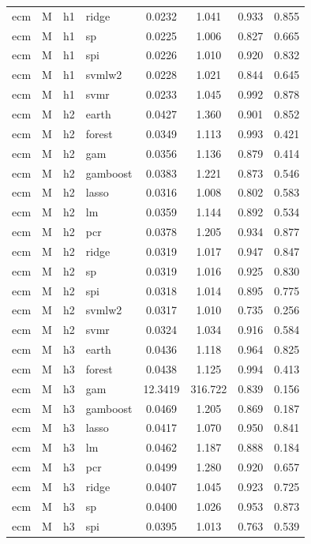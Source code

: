 \begin{ThreePartTable}
\begin{longtable}[t]{llclcccc}
ecm & M & h1 & ridge & 0.0232 & 1.041 & 0.933 & 0.855\\
ecm & M & h1 & sp & 0.0225 & 1.006 & 0.827 & 0.665\\
ecm & M & h1 & spi & 0.0226 & 1.010 & 0.920 & 0.832\\
ecm & M & h1 & svmlw2 & 0.0228 & 1.021 & 0.844 & 0.645\\
ecm & M & h1 & svmr & 0.0233 & 1.045 & 0.992 & 0.878\\
\addlinespace
ecm & M & h2 & earth & 0.0427 & 1.360 & 0.901 & 0.852\\
ecm & M & h2 & forest & 0.0349 & 1.113 & 0.993 & 0.421\\
ecm & M & h2 & gam & 0.0356 & 1.136 & 0.879 & 0.414\\
ecm & M & h2 & gamboost & 0.0383 & 1.221 & 0.873 & 0.546\\
ecm & M & h2 & lasso & 0.0316 & 1.008 & 0.802 & 0.583\\
ecm & M & h2 & lm & 0.0359 & 1.144 & 0.892 & 0.534\\
ecm & M & h2 & pcr & 0.0378 & 1.205 & 0.934 & 0.877\\
ecm & M & h2 & ridge & 0.0319 & 1.017 & 0.947 & 0.847\\
ecm & M & h2 & sp & 0.0319 & 1.016 & 0.925 & 0.830\\
ecm & M & h2 & spi & 0.0318 & 1.014 & 0.895 & 0.775\\
ecm & M & h2 & svmlw2 & 0.0317 & 1.010 & 0.735 & 0.256\\
ecm & M & h2 & svmr & 0.0324 & 1.034 & 0.916 & 0.584\\
\addlinespace
ecm & M & h3 & earth & 0.0436 & 1.118 & 0.964 & 0.825\\
ecm & M & h3 & forest & 0.0438 & 1.125 & 0.994 & 0.413\\
ecm & M & h3 & gam & 12.3419 & 316.722 & 0.839 & 0.156\\
ecm & M & h3 & gamboost & 0.0469 & 1.205 & 0.869 & 0.187\\
ecm & M & h3 & lasso & 0.0417 & 1.070 & 0.950 & 0.841\\
ecm & M & h3 & lm & 0.0462 & 1.187 & 0.888 & 0.184\\
ecm & M & h3 & pcr & 0.0499 & 1.280 & 0.920 & 0.657\\
ecm & M & h3 & ridge & 0.0407 & 1.045 & 0.923 & 0.725\\
ecm & M & h3 & sp & 0.0400 & 1.026 & 0.953 & 0.873\\
ecm & M & h3 & spi & 0.0395 & 1.013 & 0.763 & 0.539\\

\end{longtable}
\end{ThreePartTable}
